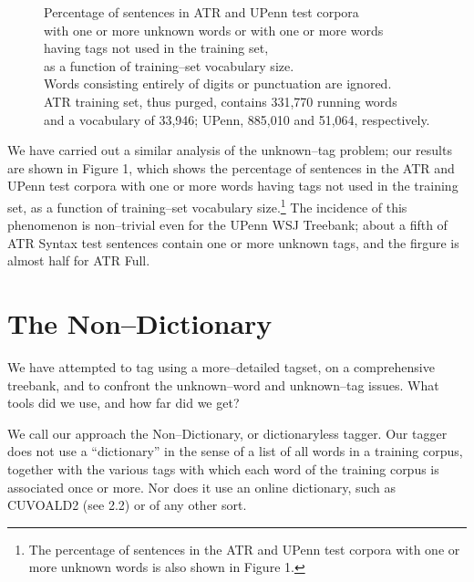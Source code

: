 \begin{figure}
\begin{center}
\end{center}
\caption{Percentage of sentences in ATR and UPenn test corpora\\
with one or more unknown words or with one or more words\\
having tags not used in the training set,\\
as a function of training--set vocabulary size.\\
Words consisting entirely of digits or punctuation are ignored.\\
ATR training set, thus purged, contains 331,770 running words\\
and a vocabulary of 33,946; UPenn, 885,010 and 51,064, respectively.
\label{unknowns}}
\vspace{3mm}
\end{figure}
 

We have carried out a similar analysis of the unknown--tag problem;
our results are shown in Figure 1, which shows the percentage of
sentences in the ATR and UPenn test corpora with one or more
words having tags not used in the training set, as a function of
training--set vocabulary size.\footnote{The percentage of sentences in
the ATR and UPenn test corpora with one or more unknown words is also
shown in Figure 1.} The incidence of this phenomenon is non--trivial
even for the UPenn WSJ Treebank; about a fifth of ATR Syntax test
sentences contain one or more unknown tags, and the firgure is almost
half for ATR Full.


\section{The Non--Dictionary}

We have attempted to tag using a more--detailed tagset, on a
comprehensive treebank, and to confront the unknown--word and
unknown--tag issues. What tools did we use, and how far did we get?

We call our approach the Non--Dictionary, or dictionaryless
tagger. Our tagger does not use a ``dictionary'' in the sense of a
list of all words in a training corpus, together with the various tags
with which each word of the training corpus is associated once or
more. Nor does it use an online dictionary, such as CUVOALD2 (see 2.2)
or of any other sort.

